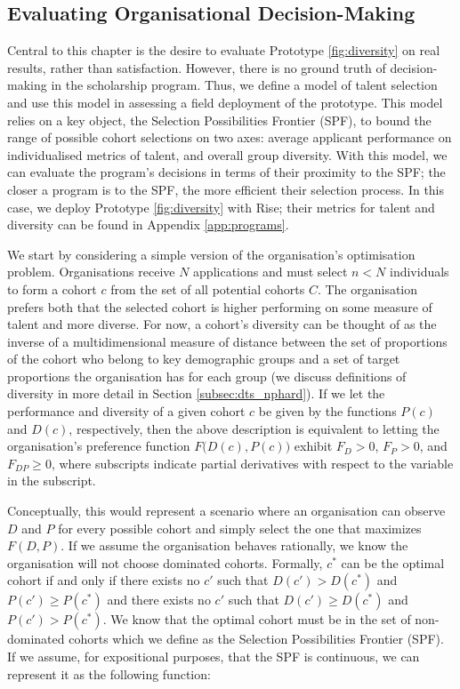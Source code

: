 \subsection{Evaluating Organisational Decision-Making}\label{ssec:measurement}
Central to this chapter is the desire to evaluate Prototype \ref{fig:diversity} on real results, rather than satisfaction. However, there is no ground truth of decision-making in the scholarship program. Thus, we define a model of talent selection and use this model in assessing a field deployment of the prototype. This model relies on a key object, the Selection Possibilities Frontier (SPF), to bound the range of possible cohort selections on two axes: average applicant performance on individualised metrics of talent, and overall group diversity. With this model, we can evaluate the program's decisions in terms of their proximity to the SPF; the closer a program is to the SPF, the more efficient their selection process. In this case, we deploy Prototype \ref{fig:diversity} with Rise; their metrics for talent and diversity can be found in Appendix \ref{app:programs}.

We start by considering a simple version of the organisation's optimisation problem. Organisations receive $N$ applications and must select $n<N$ individuals to form a cohort $c$ from the set of all potential cohorts $C$. The organisation prefers both that the selected cohort is higher performing on some measure of talent and more diverse. For now, a cohort's diversity can be thought of as the inverse of a multidimensional measure of distance between the set of proportions of the cohort who belong to key demographic groups and a set of target proportions the organisation has for each group (we discuss definitions of diversity in more detail in Section \ref{subsec:dts_nphard}). If we let the performance and diversity of a given cohort $c$ be given by the functions $P(c)$ and $D(c)$, respectively, then the above description is equivalent to letting the organisation's preference function $F\Big(D(c),P(c)\Big)$ exhibit $F_D>0$, $F_P>0$, and $F_{DP}\geq0$, where subscripts indicate partial derivatives with respect to the variable in the subscript. 

Conceptually, this would represent a scenario where an organisation can observe $D$ and $P$ for every possible cohort and simply select the one that maximizes $F(D,P)$. If we assume the organisation behaves rationally, we know the organisation will not choose dominated cohorts. Formally, $c^*$ can be the optimal cohort if and only if there exists no $c'$ such that $D(c')>D(c^*)$ and $P(c')\geq P(c^*)$ and there exists no $c'$ such that $D(c')\geq D(c^*)$ and $P(c')> P(c^*)$. We know that the optimal cohort must be in the set of non-dominated cohorts which we define as the Selection Possibilities Frontier (SPF). If we assume, for expositional purposes, that the SPF is continuous, we can represent it as the following function:

